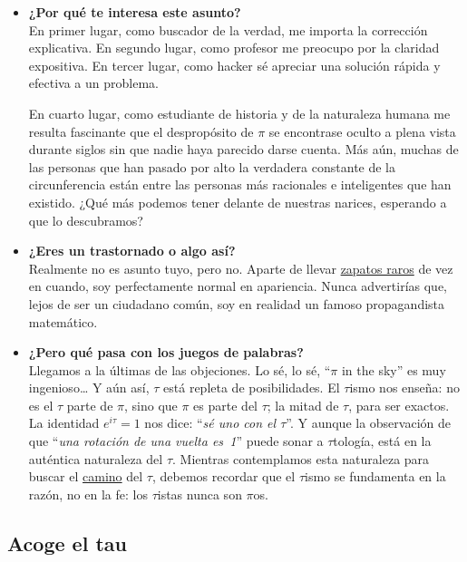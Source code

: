 \begin{itemize}
  \item \textbf{¿Por qué te interesa este asunto?} \\ En primer lugar, como buscador de la verdad, me importa la corrección explicativa. En segundo lugar, como profesor me preocupo por la claridad expositiva. En tercer lugar, como hacker sé apreciar una solución rápida y efectiva a un problema.

En cuarto lugar, como estudiante de historia y de la naturaleza humana me resulta fascinante que el despropósito de $\pi$ se encontrase oculto a plena vista durante siglos sin que nadie haya parecido darse cuenta.  Más aún, muchas de las personas que han pasado por alto la verdadera constante de la circunferencia están entre las personas más racionales e inteligentes que han existido. ¿Qué más podemos tener delante de nuestras narices, esperando a que lo descubramos?


  \item \textbf{¿Eres un trastornado o algo así?} \\ Realmente no es asunto tuyo, pero no. Aparte de llevar \href{http://www.vibramfivefingers.com/}{zapatos raros} de vez en cuando, soy perfectamente normal en apariencia. Nunca advertirías que, lejos de ser un ciudadano común, soy en realidad un famoso propagandista matemático.


  \item \textbf{¿Pero qué pasa con los juegos de palabras?} \\ Llegamos a la últimas de las objeciones. Lo sé, lo sé, ``$\pi$ in the sky'' es muy ingenioso\ldots
Y aún así, $\tau$ está repleta de posibilidades. El $\tau$ismo nos enseña: no es el $\tau$ parte de $\pi$, sino que $\pi$ es parte del $\tau$; la mitad de $\tau$, para ser exactos. La identidad $e^{i\tau} = 1$ nos dice: ``\emph{sé uno con el $\tau$}''. Y aunque la observación de que ``\emph{una rotación de una vuelta es~1}'' puede sonar a $\tau$tología, está en la auténtica naturaleza del $\tau$. Mientras contemplamos esta naturaleza para buscar el \href{https://es.wikipedia.org/wiki/Tao}{camino} del $\tau$, debemos recordar que el $\tau$ismo se fundamenta en la razón, no en la fe: los $\tau$istas nunca son $\pi$os.


\end{itemize}


  \subsection{Acoge el tau} %
  \label{sec:embrace_the_tau}

